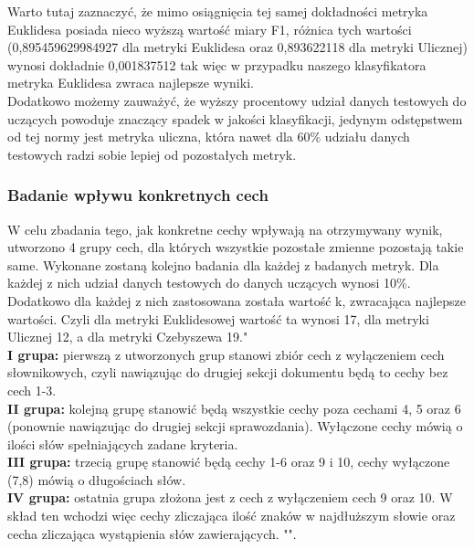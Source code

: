\documentclass{article}
\begin{document}
\noindent Warto tutaj zaznaczyć, że mimo osiągnięcia tej samej dokładności metryka Euklidesa posiada nieco wyższą wartość miary F1, różnica tych wartości \\ (0,895459629984927 dla metryki Euklidesa oraz 0,893622118 dla metryki Ulicznej) wynosi dokładnie 0,001837512 tak więc w przypadku naszego klasyfikatora metryka Euklidesa zwraca najlepsze wyniki. \\

\noindent Dodatkowo możemy zauważyć, że wyższy procentowy udział danych testowych do uczących powoduje znaczący spadek w jakości klasyfikacji, jedynym odstępstwem od tej normy jest metryka uliczna, która nawet dla 60\% udziału danych testowych radzi sobie lepiej od pozostałych metryk. \\


\subsubsection*{Badanie wpływu konkretnych cech}

\noindent W celu zbadania tego, jak konkretne cechy wpływają na otrzymywany wynik, utworzono 4 grupy cech, dla których wszystkie pozostałe zmienne pozostają takie same. Wykonane zostaną kolejno badania dla każdej z badanych metryk. Dla każdej z nich udział danych testowych do danych uczących wynosi 10\%. Dodatkowo dla każdej z nich zastosowana została wartość k, zwracająca najlepsze wartości. Czyli dla metryki Euklidesowej wartość ta wynosi 17, dla metryki Ulicznej 12, a dla metryki Czebyszewa 19." \\

\noindent \textbf{I grupa: } pierwszą z utworzonych grup stanowi zbiór cech z wyłączeniem cech słownikowych, czyli nawiązując do drugiej sekcji dokumentu będą to cechy bez cech 1-3. \\

\noindent \textbf{II grupa: } kolejną grupę stanowić będą wszystkie cechy poza cechami 4, 5 oraz 6 (ponownie nawiązując do drugiej sekcji sprawozdania). Wyłączone cechy mówią o ilości słów spełniających zadane kryteria. \\

\noindent \textbf{III grupa: } trzecią grupę stanowić będą cechy 1-6 oraz 9 i 10, cechy wyłączone (7,8) mówią o długościach słów. \\

\noindent \textbf{IV grupa: } ostatnia grupa złożona jest z cech z wyłączeniem cech 9 oraz 10. W skład ten wchodzi więc cechy zliczająca ilość znaków w najdłuższym słowie oraz cecha zliczająca wystąpienia słów zawierających. "\textendash".
\end{document}

